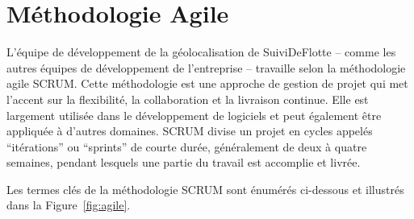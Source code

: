 \section{Méthodologie Agile}\label{sec:agile}

L'équipe de développement de la géolocalisation de SuiviDeFlotte -- comme les autres équipes de développement de l'entreprise -- travaille selon la méthodologie agile SCRUM. Cette méthodologie est une approche de gestion de projet qui met l'accent sur la flexibilité, la collaboration et la livraison continue. Elle est largement utilisée dans le développement de logiciels et peut également être appliquée à d'autres domaines. SCRUM divise un projet en cycles appelés ``itérations'' ou ``sprints'' de courte durée, généralement de deux à quatre semaines, pendant lesquels une partie du travail est accomplie et livrée.

Les termes clés de la méthodologie SCRUM sont énumérés ci-dessous et illustrés dans la Figure~\ref{fig:agile}.


